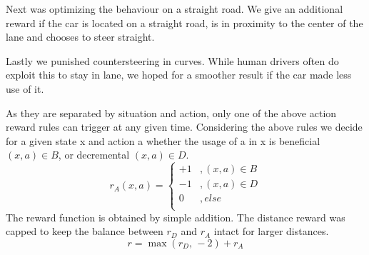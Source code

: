 Next was optimizing the behaviour on a straight road. We give an additional reward if the car is located on a straight road, is in proximity to the center of the lane and chooses to steer straight.

Lastly we punished countersteering in curves. While human drivers often do exploit this to stay in lane, we hoped for a smoother result if the car made less use of it.

As they are separated by situation and action, only one of the above action reward rules can trigger at any given time. Considering the above rules we decide for a given state x and action a whether the usage of a in x is beneficial $(x, a) \in B$, or decremental $(x, a) \in D$.
\[ r_A(x, a) = 
	\begin{cases}
		+1	&	, (x, a) \in B\\
		-1	&	, (x, a) \in D\\		
		0	&	, else\\
	\end{cases}
\]
The reward function is obtained by simple addition. The distance reward was capped to keep the balance between $r_D$ and $r_A$ intact for larger distances. 
\[ r = \max(r_D\text{, }-2) + r_A \]